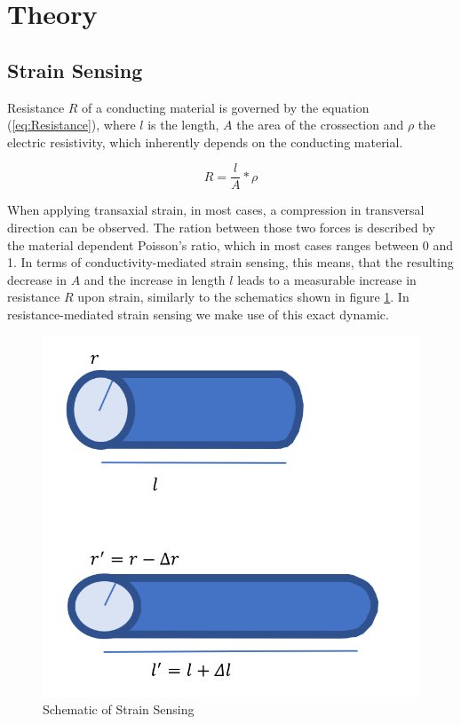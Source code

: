 \section{Theory}
\label{sec:Theory}

\subsection{Strain Sensing}
Resistance $R$ of a conducting material is governed by the equation (\ref{eq:Resistance}), where $l$ is the length, $A$ the area of the crossection and $\rho$ the electric resistivity, which inherently depends on the conducting material.

\begin{equation}
\label{eq:Resistance}
    R = \frac{l}{A}*\rho
\end{equation}

When applying transaxial strain, in most cases, a compression in transversal direction can be observed. The ration between those two forces is described by the material dependent Poisson's ratio, which in most cases ranges between 0 and 1. \cite{Gercek} In terms of conductivity-mediated strain sensing, this means, that the resulting decrease in $A$ and the increase in length $l$ leads to a measurable increase in resistance $R$ upon strain, similarly to the schematics shown in figure \ref{fig:SchemStrSens}. In resistance-mediated strain sensing we make use of this exact dynamic.

\begin{figure}[H]
\centerline{\includegraphics[scale=0.4]{./pic/SchematicStrainSensing.PNG}}
    \caption{Schematic of Strain Sensing}
    \label{fig:SchemStrSens}
\end{figure}

